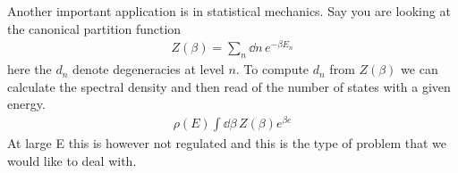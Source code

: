 \documentclass[a4paper,12pt]{article}
\begin{document}
Another important application is in statistical mechanics. Say you are looking at the canonical partition function
\begin{equation}
	\begin{aligned}
		Z(\beta)=\sum_n \dd n\, e^{-\beta E_n}
	\end{aligned}
\end{equation}
here the $d_n$ denote degeneracies at level $n$. To compute $d_n$ from $Z(\beta)$ we can calculate the spectral density and then read of the number of states with a given energy.
\begin{equation}
	\begin{aligned}
	\rho(E)	\int\dd \beta \,Z(\beta)e^{\beta e}
	\end{aligned}
\end{equation}
At large E this is however not regulated and this is the type of problem that we would like to deal with.
\end{document}
